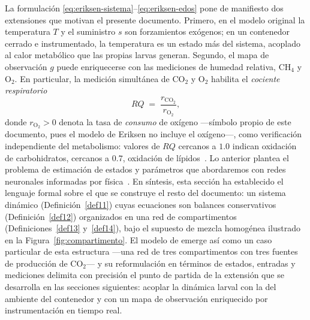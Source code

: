 \begin{remark}
La formulación \eqref{eq:eriksen-sistema}--\eqref{eq:eriksen-edos} pone de
manifiesto dos extensiones que motivan el presente documento. Primero, en el
modelo original la temperatura $T$ y el suministro $s$ son forzamientos
exógenos; en un contenedor cerrado e instrumentado, la temperatura es un
estado más del sistema, acoplado al calor metabólico que las propias larvas
generan. Segundo, el mapa de observación $g$ puede enriquecerse con las
mediciones de humedad relativa, CH$_4$ y O$_2$. En particular, la medición
simultánea de CO$_2$ y O$_2$ habilita el \emph{cociente respiratorio}
\begin{equation}
RQ \;=\; \frac{r_{\mathrm{CO_2}}}{r_{\mathrm{O_2}}},
\label{eq:rq}
\end{equation}
donde $r_{\mathrm{O_2}} > 0$ denota la tasa de \emph{consumo} de oxígeno
---símbolo propio de este documento, pues el modelo de Eriksen no incluye el
oxígeno---, como verificación independiente del metabolismo: valores de
$RQ$ cercanos a $1.0$ indican oxidación de carbohidratos, cercanos a $0.7$,
oxidación de lípidos~\citep{lightonMeasuringMetabolicRates2008}. Lo anterior plantea el problema de estimación de
estados y parámetros que abordaremos con redes neuronales informadas por
física~\citep{raissiPhysicsinformedNeuralNetworks2019a}. En síntesis, esta sección ha establecido el lenguaje formal sobre el
que se construye el resto del documento: un sistema dinámico
(Definición~\ref{def11}) cuyas ecuaciones son balances conservativos
(Definición~\ref{def12}) organizados en una red de compartimentos
(Definiciones~\ref{def13} y~\ref{def14}), bajo el supuesto de mezcla
homogénea ilustrado en la Figura~\ref{fig:compartimento}. El modelo de
\citet{eriksenDynamicModellingFeed2022} emerge así como un caso particular de esta
estructura ---una red de tres compartimentos con tres fuentes de producción
de CO$_2$--- y su reformulación en términos de estados, entradas y
mediciones delimita con precisión el punto de partida de la extensión que se
desarrolla en las secciones siguientes: acoplar la dinámica larval con la
del ambiente del contenedor y con un mapa de observación enriquecido por
instrumentación en tiempo real.
\end{remark}
